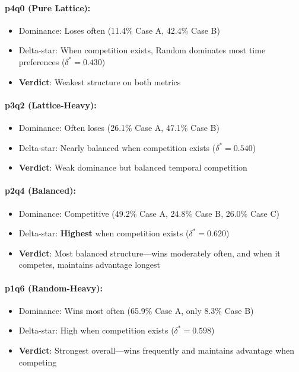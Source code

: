 \documentclass[12pt,a4paper]{article}
\begin{document}
\paragraph{p4q0 (Pure Lattice):}
\begin{itemize}
    \item Dominance: Loses often (11.4\% Case A, 42.4\% Case B)
    \item Delta-star: When competition exists, Random dominates most time preferences ($\delta^* = 0.430$)
    \item \textbf{Verdict}: Weakest structure on both metrics
\end{itemize}

\paragraph{p3q2 (Lattice-Heavy):}
\begin{itemize}
    \item Dominance: Often loses (26.1\% Case A, 47.1\% Case B)
    \item Delta-star: Nearly balanced when competition exists ($\delta^* = 0.540$)
    \item \textbf{Verdict}: Weak dominance but balanced temporal competition
\end{itemize}

\paragraph{p2q4 (Balanced):}
\begin{itemize}
    \item Dominance: Competitive (49.2\% Case A, 24.8\% Case B, 26.0\% Case C)
    \item Delta-star: \textbf{Highest} when competition exists ($\delta^* = 0.620$)
    \item \textbf{Verdict}: Most balanced structure---wins moderately often, and when it competes, maintains advantage longest
\end{itemize}

\paragraph{p1q6 (Random-Heavy):}
\begin{itemize}
    \item Dominance: Wins most often (65.9\% Case A, only 8.3\% Case B)
    \item Delta-star: High when competition exists ($\delta^* = 0.598$)
    \item \textbf{Verdict}: Strongest overall---wins frequently and maintains advantage when competing
\end{itemize}
\end{document}
